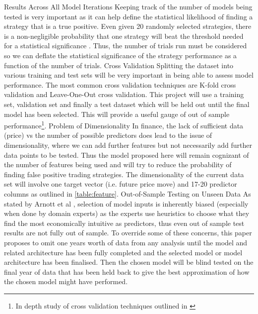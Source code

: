 \documentclass[11pt]{article}
\begin{document}
Results Across All Model Iterations
Keeping track of the number of models being tested is very important as it can help define the statistical likelihood of finding a strategy that is a true positive. Even given 20 randomly selected strategies, there is a non-negligible probability that one strategy will beat the threshold needed for a statistical significance \cite{Arnott2018}. Thus, the number of trials run must be considered so we can deflate the statistical significance of the strategy performance as a function of the number of trials\cite{Bailey2011}.
Cross Validation
Splitting the dataset into various training and test sets will be very important in being able to assess model performance. The most common cross validation techniques are K-fold cross validation and Leave-One-Out cross validation. This project will use a training set, validation set and finally a test dataset which will be held out until the final model has been selected. This will provide a useful gauge of out of sample performance\footnote{In depth study of cross validation techniques outlined in \cite{Bergmeir2012}}.
Problem of Dimensionality
 In finance, the lack of sufficient data (price) vs the number of possible predictors does lead to the issue of dimensionality, where we can add further features but not necessarily add further data points to be tested. Thus the model proposed here will remain cognizant of the number of features being used and will try to reduce the probability of finding false positive trading strategies. The dimensionality of the current data set will involve one target vector (i.e. future price move) and 17-20 predictor columns as outlined in \ref{table:feature}.
Out-of-Sample Testing on Unseen Data
 As stated by Arnott et al \cite{Arnott2018}, selection of model inputs is inherently biased (especially when done by domain experts) as the experts use heuristics to choose what they find the most economically intuitive as predictors, thus even out of sample test results are not fully out of sample. To override some of these concerns, this paper proposes to omit one years worth of data from any analysis until the model and related architecture has been fully completed and the selected model or model architecture has been finalised. Then the chosen model will be blind tested on the final year of data that has been held back to give the best approximation of how the chosen model might have performed. 

{}
\clearpage
\end{document}
